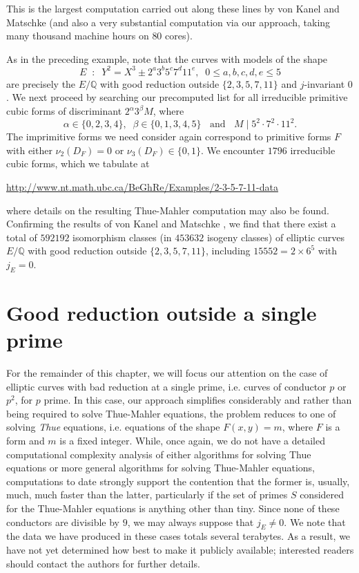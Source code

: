 This is the largest computation carried out along these lines by von Kanel and Matschke \cite{KanMat} (and also a very substantial computation via our approach, 
taking many thousand machine hours on $80$ cores).

As in the preceding example, note that
the curves with models of the shape
$$
E \; \; : \; \; Y^2 = X^3 \pm 2^a 3^b 5^c 7^d 11^e, \; \; 0 \leq a, b, c, d, e \leq 5
$$
are precisely the $E/\mathbb{Q}$  with good reduction outside $\{ 2, 3, 5, 7, 11 \}$ and $j$-invariant $0$. We next proceed  by searching our precomputed list for all irreducible primitive cubic forms of discriminant $2^{\alpha} 3^\beta M$,
where 
$$
\alpha \in \{ 0, 2, 3, 4 \}, \; \; \beta \in \{ 0, 1, 3, 4, 5 \} \; \; \mbox{ and } \; \; M \mid 5^2 \cdot 7^2 \cdot 11^2. 
$$
The imprimitive forms we need consider again correspond to primitive 
forms $F$ with either $\nu_2 (D_F) = 0$ or $\nu_3 (D_F) \in \{ 0, 1 \}$.
We encounter $1796$ irreducible cubic forms, which we tabulate at 
\begin{center}
\url{http://www.nt.math.ubc.ca/BeGhRe/Examples/2-3-5-7-11-data}
\end{center}
where details on the resulting Thue-Mahler computation may also be found. Confirming the results of von Kanel and Matschke \cite{KanMat}, we find that there exist a total of $592192$ isomorphism classes (in $453632$ isogeny classes) of elliptic curves $E/\mathbb{Q}$ with good reduction outside $\{ 2, 3, 5, 7, 11\}$, including $15552=2 \times 6^5$ with $j_E=0$.


\section{Good reduction outside a single prime} \label{primes}

For the remainder of this chapter, we will focus our attention on the case of elliptic curves with bad reduction at a single prime, i.e. curves of conductor $p$ or $p^2$, for $p$ prime.
In this case, our approach simplifies considerably and 
rather than being required to solve Thue-Mahler equations, the problem reduces to one of solving \emph{Thue} equations, i.e. equations of the shape $F(x,y)=m$, where $F$ is a form and $m$ is a fixed integer. While, once again, we do not have a detailed computational complexity analysis of either algorithms for solving Thue equations or more general algorithms for solving Thue-Mahler equations, computations to date strongly support the contention that the former is, usually, much, much faster than the latter, particularly if the set of primes $S$ considered for the Thue-Mahler equations is anything other than tiny. Since none of these conductors are divisible by $9$, we may always suppose that $j_E \neq 0$. We note that the data we have produced in these cases totals several terabytes. As a result, we have not yet determined how best to make it publicly available; interested readers should contact the authors for further details.

